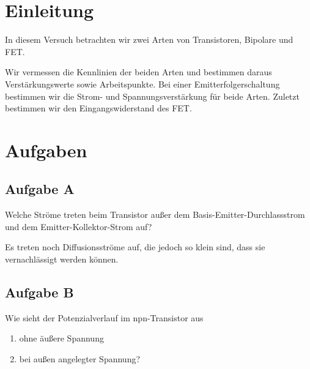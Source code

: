 \newpage
\tableofcontents

\listoftodo
\newpage


\FloatBarrier
\section{Einleitung}

In diesem Versuch betrachten wir zwei Arten von Transistoren, Bipolare und FET.

Wir vermessen die Kennlinien der beiden Arten und bestimmen daraus
Verstärkungswerte sowie Arbeitspunkte. Bei einer Emitterfolgerschaltung
bestimmen wir die Strom- und Spannungsverstärkung für beide Arten. Zuletzt
bestimmen wir den Eingangswiderstand des FET.


\FloatBarrier
\section{Aufgaben}

\FloatBarrier
\subsection{Aufgabe A}

\begin{problem}
	Welche Ströme treten beim Transistor außer dem Basis-Emitter-Durchlassstrom
	und dem Emitter-Kollektor-Strom auf?
\end{problem}

Es treten noch Diffusionsströme auf, die jedoch so klein sind, dass sie
vernachlässigt werden können.

\FloatBarrier
\subsection{Aufgabe B}

\begin{problem}
	Wie sieht der Potenzialverlauf im npn-Transistor aus
	\begin{enumerate}
		\item
			ohne äußere Spannung
		\item
			bei außen angelegter Spannung?
	\end{enumerate}
\end{problem}

